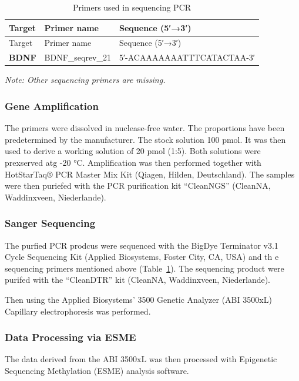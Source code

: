 \documentclass[
  letterpaper,
  DIV=11,
  numbers=noendperiod]{scrartcl}
\begin{document}
\begin{longtable}[]{@{}lll@{}}
\caption{Primers used in sequencing
PCR}\label{tbl-primers-seq}\tabularnewline
\toprule\noalign{}
Target & Primer name & Sequence (5′→3′) \\
\midrule\noalign{}
\endfirsthead
\toprule\noalign{}
Target & Primer name & Sequence (5′→3′) \\
\midrule\noalign{}
\endhead
\bottomrule\noalign{}
\endlastfoot
\textbf{BDNF} & BDNF\_seqrev\_21 & 5′-ACAAAAAAATTTCATACTAA-3′ \\
\end{longtable}

\emph{Note: Other sequencing primers are missing.}

\subsubsection{Gene Amplification}\label{gene-amplification}

The primers were dissolved in nuclease-free water. The proportions have
been predetermined by the manufacturer. The stock solution 100 pmol. It
was then used to derive a working solution of 20 pmol (1:5). Both
solutions were prexserved atg -20 °C. Amplification was then performed
together with HotStarTaq® PCR Master Mix Kit (Qiagen, Hilden,
Deutschland). The samples were then puriefed with the PCR purification
kit ``CleanNGS'' (CleanNA, Waddinxveen, Niederlande).

\subsubsection{Sanger Sequencing}\label{sanger-sequencing}

The purfied PCR prodcus were sequenced with the BigDye Terminator v3.1
Cycle Sequencing Kit (Applied Biosystems, Foster City, CA, USA) and th e
sequencing primers mentioned above (Table~\ref{tbl-primers-seq}). The
sequencing product were purifed with the ``CleanDTR'' kit (CleanNA,
Waddinxveen, Niederlande).

Then using the Applied Biosystems' 3500 Genetic Analyzer (ABI 3500xL)
Capillary electrophoresis was performed.

\subsubsection{Data Processing via ESME}\label{data-processing-via-esme}

The data derived from the ABI 3500xL was then processed with Epigenetic
Sequencing Methylation (ESME) analysis software.
\end{document}
